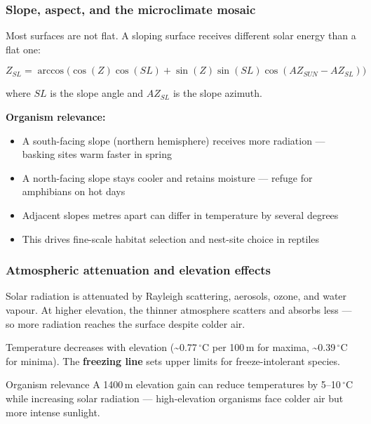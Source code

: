 \documentclass{beamer}
\begin{document}
\begin{frame}
  \frametitle{Slope, aspect, and the microclimate mosaic}

  Most surfaces are not flat. A sloping surface receives different solar energy than a flat one:

  \[Z_{SL} = \arccos\big( \cos(Z) \cos(SL) + \sin(Z) \sin(SL) \cos(AZ_{SUN} - AZ_{SL}) \big)\]

  where $SL$ is the slope angle and $AZ_{SL}$ is the slope azimuth.

  \vspace{0.2cm}

  \textbf{Organism relevance:}
  \begin{itemize}
    \item A south-facing slope (northern hemisphere) receives more radiation --- basking sites warm faster in spring
    \item A north-facing slope stays cooler and retains moisture --- refuge for amphibians on hot days
    \item Adjacent slopes metres apart can differ in temperature by several degrees
    \item This drives fine-scale habitat selection and nest-site choice in reptiles
  \end{itemize}
\end{frame}

\begin{frame}
  \frametitle{Atmospheric attenuation and elevation effects}

  Solar radiation is attenuated by Rayleigh scattering, aerosols, ozone, and water vapour. At higher elevation, the thinner atmosphere scatters and absorbs less --- so more radiation reaches the surface despite colder air.

  \vspace{0.2cm}

  Temperature decreases with elevation (\textasciitilde0.77$\,^\circ$C per 100\,m for maxima, \textasciitilde0.39$\,^\circ$C for minima). The \textbf{freezing line} sets upper limits for freeze-intolerant species.

  \vspace{0.2cm}

  \begin{block}{Organism relevance}
    A 1400\,m elevation gain can reduce temperatures by 5--10$\,^\circ$C while increasing solar radiation --- high-elevation organisms face colder air but more intense sunlight.
  \end{block}
\end{frame}
\end{document}
